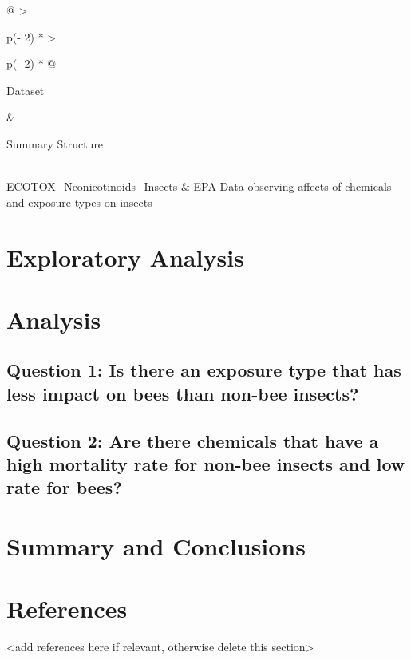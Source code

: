 \documentclass[
  12pt,
]{article}
\begin{document}
\begin{longtable}[]{@{}
  >{\raggedright\arraybackslash}p{(\columnwidth - 2\tabcolsep) * }
  >{\raggedright\arraybackslash}p{(\columnwidth - 2\tabcolsep) * }@{}}
\toprule
\begin{minipage}[b]{\linewidth}\raggedright
Dataset
\end{minipage} & \begin{minipage}[b]{\linewidth}\raggedright
Summary Structure
\end{minipage} \\
\midrule
\endhead
ECOTOX\_Neonicotinoids\_Insects & EPA Data observing affects of
chemicals and exposure types on insects \\
\bottomrule
\end{longtable}

\newpage

\hypertarget{exploratory-analysis}{%
\section{Exploratory Analysis}\label{exploratory-analysis}}

\newpage

\hypertarget{analysis}{%
\section{Analysis}\label{analysis}}

\hypertarget{question-1-is-there-an-exposure-type-that-has-less-impact-on-bees-than-non-bee-insects}{%
\subsection{Question 1: Is there an exposure type that has less impact
on bees than non-bee
insects?}\label{question-1-is-there-an-exposure-type-that-has-less-impact-on-bees-than-non-bee-insects}}

\hypertarget{question-2-are-there-chemicals-that-have-a-high-mortality-rate-for-non-bee-insects-and-low-rate-for-bees}{%
\subsection{Question 2: Are there chemicals that have a high mortality
rate for non-bee insects and low rate for
bees?}\label{question-2-are-there-chemicals-that-have-a-high-mortality-rate-for-non-bee-insects-and-low-rate-for-bees}}

\newpage

\hypertarget{summary-and-conclusions}{%
\section{Summary and Conclusions}\label{summary-and-conclusions}}

\newpage

\hypertarget{references}{%
\section{References}\label{references}}

\textless add references here if relevant, otherwise delete this
section\textgreater{}
\end{document}
